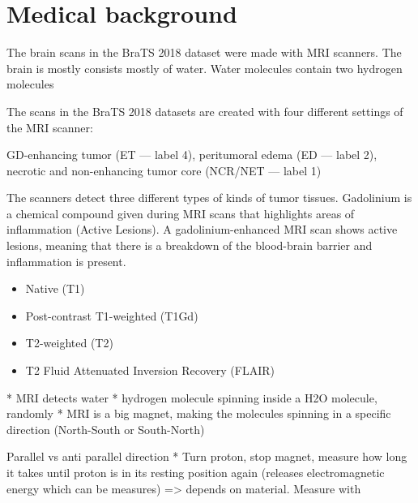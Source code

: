 \section{Medical background}
The brain scans in the BraTS 2018 dataset were made with MRI scanners. The brain is mostly consists mostly of water. Water molecules contain two hydrogen molecules




The scans in the BraTS 2018 datasets are created with four different settings of the MRI scanner:

GD-enhancing tumor (ET — label 4),
peritumoral edema (ED — label 2),
necrotic and non-enhancing tumor core (NCR/NET — label 1)


The scanners detect three different types of kinds of tumor tissues. 
Gadolinium is a chemical compound given during MRI scans that highlights areas of inflammation (Active Lesions). A gadolinium-enhanced  MRI scan shows active lesions, meaning that there is a breakdown of the blood-brain barrier and inflammation is present.


\begin{itemize}
    \item Native (T1)
    \item Post-contrast T1-weighted (T1Gd)
    \item T2-weighted (T2)
    \item T2 Fluid Attenuated Inversion Recovery (FLAIR)
\end{itemize}







* MRI detects water
* hydrogen molecule spinning inside a H2O molecule, randomly
* MRI is a big magnet, making the molecules spinning in a specific direction (North-South or South-North)

Parallel vs anti parallel direction
* Turn proton, stop magnet, measure how long it takes until proton is in its resting position again (releases electromagnetic energy which can be measures) => depends on material. Measure with 